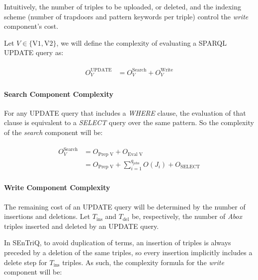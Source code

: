 Intuitively, the number of triples to be uploaded, or deleted, and the indexing scheme (number of trapdoors and pattern keywords per triple) control the \textit{write} component's cost.

Let $V \in \{\text{V1}, \text{V2}\}$, we will define the complexity of evaluating a \gls{SPARQL} UPDATE query as:

\begin{align}
    \label{equation:sparql-update-complexity-general}
    \begin{split}
        O^{\text{UPDATE}}_V &= O^{\text{Search}}_V + O^{\text{Write}}_V
    \end{split}
\end{align}


\paragraph{Search Component Complexity}

For any UPDATE query that includes a \textit{WHERE} clause, the evaluation of that clause is equivalent to a \textit{SELECT} query over the same pattern. So the complexity of the \emph{search} component will be:

\begin{align}
    \label{equation:update-where-select}
    \begin{split}
        O^{\text{Search}}_V
        &= O_{\text{Prep V}} + O_{\text{Eval V}} \\
        &= O_{\text{Prep V}} + \sum_{i=1}^{q_{\text{jobs}}} O(J_i) + O_{\text{SELECT}}
    \end{split}
\end{align}

\paragraph{Write Component Complexity}

The remaining cost of an UPDATE query will be determined by the number of insertions and deletions. Let $T_{\text{ins}}$ and $T_{\text{del}}$ be, respectively, the number of \emph{Abox} triples inserted and deleted by an UPDATE query. 

In \gls{SEnTriQ}, to avoid duplication of terms, an insertion of triples is always preceded by a deletion of the same triples, so every insertion implicitly includes a delete step for $T_{\text{ins}}$ triples. As such, the complexity formula for the \emph{write} component will be:

